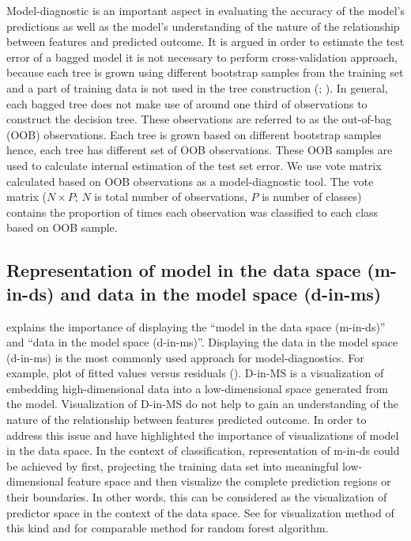 \documentclass[11pt,a4paper,]{article}
\begin{document}
Model-diagnostic is an important aspect in evaluating the accuracy of
the model's predictions as well as the model's understanding of the
nature of the relationship between features and predicted outcome. It is
argued in order to estimate the test error of a bagged model it is not
necessary to perform cross-validation approach, because each tree is
grown using different bootstrap samples from the training set and a part
of training data is not used in the tree construction
(\textcite{breiman2001random}; \textcite{chen2004using}). In general,
each bagged tree does not make use of around one third of observations
to construct the decision tree. These observations are referred to as
the out-of-bag (OOB) observations. Each tree is grown based on different
bootstrap samples hence, each tree has different set of OOB
observations. These OOB samples are used to calculate internal
estimation of the test set error. We use vote matrix calculated based on
OOB observations as a model-diagnostic tool. The vote matrix
(\(N \times P\); \(N\) is total number of observations, \(P\) is number
of classes) contains the proportion of times each observation was
classified to each class based on OOB sample.

\subsection{Representation of model in the data space (m-in-ds) and data
in the model space
(d-in-ms)}\label{representation-of-model-in-the-data-space-m-in-ds-and-data-in-the-model-space-d-in-ms}

\textcite{wickham2015visualizing} explains the importance of displaying
the ``model in the data space (m-in-ds)'' and ``data in the model space
(d-in-ms)''. Displaying the data in the model space (d-in-ms) is the
most commonly used approach for model-diagnostics. For example, plot of
fitted values versus residuals (\textcite{wickham2015visualizing}).
D-in-MS is a visualization of embedding high-dimensional data into a
low-dimensional space generated from the model. Visualization of D-in-MS
do not help to gain an understanding of the nature of the relationship
between features predicted outcome. In order to address this issue
\textcite{wickham2015visualizing} and \textcite{da2017interactive} have
highlighted the importance of visualizations of model in the data space.
In the context of classification, representation of m-in-ds could be
achieved by first, projecting the training data set into meaningful
low-dimensional feature space and then visualize the complete prediction
regions or their boundaries. In other words, this can be considered as
the visualization of predictor space in the context of the data space.
See \textcite{wickham2015visualizing} for visualization method of this
kind and \textcite{da2017interactive} for comparable method for random
forest algorithm.
\end{document}
